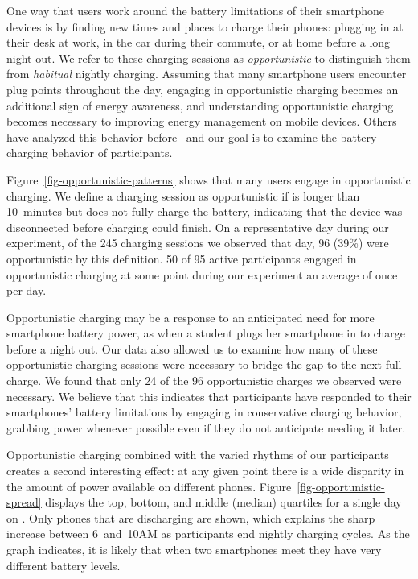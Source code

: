 One way that users work around the battery limitations of their smartphone
devices is by finding new times and places to charge their phones: plugging
in at their desk at work, in the car during their commute, or at home before
a long night out. We refer to these charging sessions as
\textit{opportunistic} to distinguish them from \textit{habitual} nightly
charging. Assuming that many smartphone users encounter plug points
throughout the day, engaging in opportunistic charging becomes an additional
sign of energy awareness, and understanding opportunistic charging becomes
necessary to improving energy management on mobile devices. Others have analyzed
this behavior before~\cite{banerjee:ubicomp:2007} and
our goal is to examine the battery charging behavior of \PhoneLab{} participants.

Figure~\ref{fig-opportunistic-patterns} shows that many users engage in
opportunistic charging. We define a charging session as opportunistic if is
longer than 10~minutes but does not fully charge the battery, indicating that
the device was disconnected before charging could finish. On a representative
day during our experiment, of the 245 charging sessions we observed that day,
96 (39\%) were opportunistic by this definition. 50 of 95 active participants
engaged in opportunistic charging at some point during our experiment an
average of once per day.

Opportunistic charging may be a response to an anticipated need for more
smartphone battery power, as when a student plugs her smartphone in to charge
before a night out. Our data also allowed us to examine how many of these
opportunistic charging sessions were necessary to bridge the gap to the next
full charge. We found that only 24 of the 96 opportunistic charges we
observed were necessary. We believe that this indicates that participants
have responded to their smartphones' battery limitations by engaging in
conservative charging behavior, grabbing power whenever possible even if they
do not anticipate needing it later.

Opportunistic charging combined with the varied rhythms of our participants
creates a second interesting effect: at any given point there is a wide
disparity in the amount of power available on different phones.
Figure~\ref{fig-opportunistic-spread} displays the top, bottom, and middle
(median) quartiles for a single day on \PhoneLab{}. Only phones that are
discharging are shown, which explains the sharp increase between 6~and~10AM
as participants end nightly charging cycles.  As the graph indicates, it is
likely that when two smartphones meet they have very different battery
levels.

